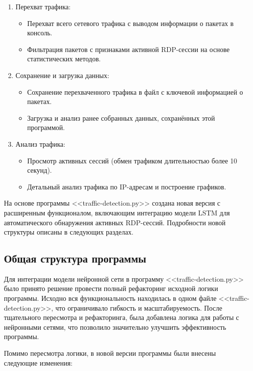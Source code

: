 \documentclass[spec, och, diploma]{SCWorks}
\begin{document}
\begin{enumerate}
  \item Перехват трафика:
  
  \begin{itemize}
    \item Перехват всего сетевого трафика с выводом информации о пакетах в консоль.
    \item Фильтрация пакетов с признаками активной RDP-сессии на основе статистических методов.
  \end{itemize}
  \item Сохранение и загрузка данных:
  \begin{itemize}
    \item Сохранение перехваченного трафика в файл с ключевой информацией о пакетах.
    \item Загрузка и анализ ранее собранных данных, сохранённых этой программой.
  \end{itemize}
  \item Анализ трафика:
  \begin{itemize}
    \item Просмотр активных сессий (обмен трафиком длительностью более 10 секунд).
    \item Детальный анализ трафика по IP-адресам и построение графиков.
  \end{itemize}

\end{enumerate}

  На основе программы <<traffic-detection.py>> создана новая версия с расширенным функционалом, включающим интеграцию модели 
  LSTM для автоматического обнаружения активных RDP-сессий. Подробности новой структуры описаны в следующих разделах.

\subsection{Общая структура программы}

Для интеграции модели нейронной сети в программу <<traffic-detection.py>> было принято решение провести полный рефакторинг исходной логики программы. 
Исходно вся функциональность находилась в одном файле <<traffic-detection.py>>, что ограничивало гибкость и масштабируемость. После тщательного 
пересмотра и рефакторинга, была добавлена логика для работы с нейронными сетями, что позволило значительно улучшить эффективность программы.

Помимо пересмотра логики, в новой версии программы были внесены следующие изменения:
\end{document}
